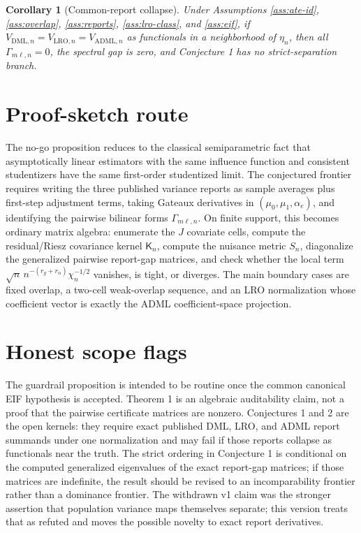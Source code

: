 \documentclass[11pt]{article}
\theoremstyle{definition}
\theoremstyle{plain}
\newtheorem{corollary}{Corollary}
\theoremstyle{remark}
\begin{document}
\begin{corollary}[Common-report collapse]\label{cor:common-report}
Under Assumptions \ref{ass:ate-id}, \ref{ass:overlap}, \ref{ass:reports},
\ref{ass:lro-class}, and \ref{ass:eif}, if
\(V_{\mathrm{DML},n}=V_{\mathrm{LRO},n}=V_{\mathrm{ADML},n}\) as functionals
in a neighborhood of \(\eta_n\), then all \(\Gamma_{m\ell,n}=0\), the spectral
gap is zero, and Conjecture 1 has no strict-separation branch.
\end{corollary}

\section{Proof-sketch route}
The no-go proposition reduces to the classical semiparametric fact that
asymptotically linear estimators with the same influence function and
consistent studentizers have the same first-order studentized limit.  The
conjectured frontier requires writing the three published variance reports as
sample averages plus first-step adjustment terms, taking Gateaux derivatives
in \((\mu_0,\mu_1,\alpha_e)\), and identifying the pairwise bilinear forms
\(\Gamma_{m\ell,n}\).  On finite support, this becomes ordinary matrix
algebra: enumerate the \(J\) covariate cells, compute the residual/Riesz
covariance kernel \(\mathsf K_n\), compute the nuisance metric \(S_n\), diagonalize
the generalized pairwise report-gap matrices, and
check whether the local term
\(\sqrt n\,n^{-(r_g+r_\alpha)}\chi_n^{-1/2}\) vanishes, is tight, or diverges.
The main boundary cases are fixed overlap, a two-cell
weak-overlap sequence, and an LRO normalization whose coefficient vector is
exactly the ADML coefficient-space projection.

\section{Honest scope flags}
The guardrail proposition is intended to be routine once the common canonical
EIF hypothesis is accepted.  Theorem 1 is an algebraic auditability claim, not a proof that
the pairwise certificate matrices are nonzero.  Conjectures 1 and 2 are the
open kernels: they require exact published DML, LRO, and ADML report summands
under one normalization and may fail if those reports collapse as functionals
near the truth.  The strict ordering in Conjecture 1 is conditional on the
computed generalized eigenvalues of the exact report-gap matrices; if those
matrices are indefinite, the result should be revised to an incomparability
frontier rather than a dominance frontier.  The withdrawn v1 claim was the
stronger assertion that population variance maps themselves separate; this
version treats that as refuted and moves the possible novelty to exact report
derivatives.
\end{document}

